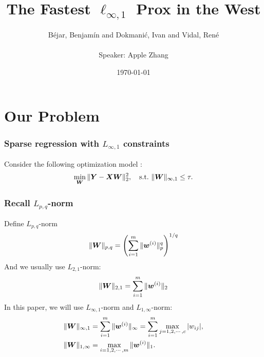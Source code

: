 \documentclass{beamer}
\begin{document}
    \title[KKT, prox, projection]{The Fastest $\ell_{\infty,1}$ Prox in the West}
    \author[Apple Zhang]{B\'ejar, Benjam\'in and Dokmani\'c, Ivan and Vidal, Ren\'e\\~\\\small Speaker: Apple Zhang} %
    \date{\today}  %
\begin{frame}
    \titlepage
\end{frame}

\section[Table of Contents]{}
\frame {
    \frametitle{\secname}
    \tableofcontents
}


\section{Our Problem}

\begin{frame}[fragile]
    \frametitle{Sparse regression with $L_{\infty,1}$ constraints}
    Consider the following optimization model \cite{L1infprox}:
    \begin{align}
        \min_{{\bm W}}\|{\bm Y}-{\bm X}{\bm W}\|_2^2,\quad\mathrm{s.t.}~\|{\bm W}\|_{\infty,1}\leq\tau.
    \end{align}
\end{frame}

\begin{frame}[fragile]
    \frametitle{Recall $L_{p,q}$-norm}
    Define $L_{p,q}$-norm
    \begin{equation}
        \|{\bm W}\|_{p,q}=\left(\sum_{i=1}^m\|{\bm w}^{(i)}\|_p^q\right)^{1/q}
    \end{equation}
    And we usually use $L_{2,1}$-norm:
    \begin{equation}
        \|{\bm W}\|_{2,1}=\sum_{i=1}^m\|{\bm w}^{(i)}\|_2
    \end{equation}
    In this paper, we will use $L_{\infty,1}$-norm and $L_{1,\infty}$-norm:
    \begin{align}
        &\|{\bm W}\|_{\infty,1}=\sum_{i=1}^m\|{\bm w}^{(i)}\|_\infty=\sum_{i=1}^m\max_{j=1,2,\cdots,c}|w_{ij}|,\\
        &\|{\bm W}\|_{1,\infty}=\max_{i=1,2,\cdots,m}\|{\bm w}^{(i)}\|_1.
    \end{align}
\end{frame}
\end{document}
